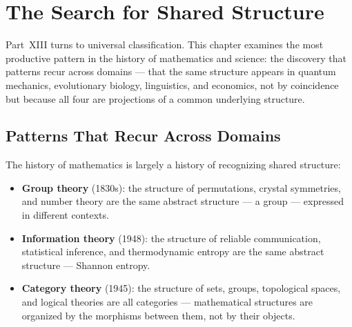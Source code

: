 \chapter{The Search for Shared Structure}



Part~XIII turns to universal classification. This chapter examines the
most productive pattern in the history of mathematics and science: the
discovery that patterns recur across domains — that the same structure
appears in quantum mechanics, evolutionary biology, linguistics, and
economics, not by coincidence but because all four are projections of
a common underlying structure.

\section{Patterns That Recur Across Domains}

The history of mathematics is largely a history of recognizing shared
structure:

\begin{itemize}
  \item \textbf{Group theory} (1830s): the structure of permutations,
        crystal symmetries, and number theory are the same abstract
        structure — a group — expressed in different contexts.
  \item \textbf{Information theory} (1948): the structure of reliable
        communication, statistical inference, and thermodynamic entropy
        are the same abstract structure — Shannon entropy.
  \item \textbf{Category theory} (1945): the structure of sets,
        groups, topological spaces, and logical theories are all
        categories — mathematical structures are organized by the
        morphisms between them, not by their objects.
\end{itemize}


